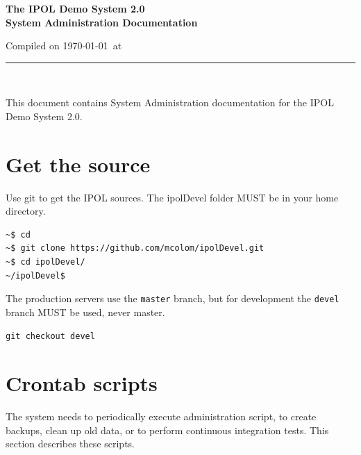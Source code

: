 \documentclass[a4paper,12pt]{article}
\begin{document}
\begin{titlepage}

\begin{center}
\vspace*{-1in}

\vspace*{0.6in}
\begin{Large}
\textbf{The IPOL Demo System 2.0 \\System Administration Documentation} \\
\end{Large}

\vspace*{0.6in}

\small{Compiled on \today\ at \currenttime}

\vspace*{0.6in}
\rule{80mm}{0.1mm}\\
\vspace*{0.1in}
\end{center}

\end{titlepage}

This document contains System Administration documentation for the IPOL Demo System 2.0.
\vspace*{0.6in}


\newpage

\tableofcontents
\newpage

\section{Get the source}
Use git to get the IPOL sources. The ipolDevel folder MUST be in your home directory.
\begin{verbatim}
~$ cd
~$ git clone https://github.com/mcolom/ipolDevel.git
~$ cd ipolDevel/
~/ipolDevel$
\end{verbatim}

The production servers use the {\tt master} branch, but for development the {\tt devel} branch MUST be used, never master.
\begin{verbatim}
git checkout devel
\end{verbatim}


\section{Crontab scripts}
The system needs to periodically execute administration script, to create backups, clean up old data, or to perform continuous integration tests. This section describes these scripts.
\end{document}
